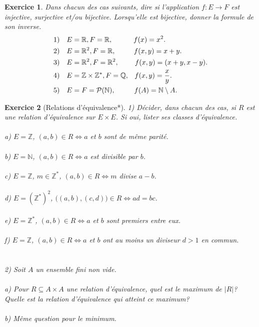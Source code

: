 \documentclass[11pt,french,table]{article}
\theoremstyle{exercice}
\newtheorem{exercice}{Exercice}
\newcommand{\R}{\mathbb{R}}
\newcommand{\Q}{\mathbb{Q}}
\newcommand{\Z}{\mathbb{Z}}
\newcommand{\N}{\mathbb{N}}
\begin{document}
\vspace{2em}
\begin{exercice}
Dans chacun des cas suivants, dire si l'application $f : E \longrightarrow F$ est injective, surjective et/ou bijective. Lorsqu'elle est bijective, donner la formule de son inverse. 
\begin{align*}
\textnormal{1)}& \quad E = \R, F=\R, \hspace{3em} f(x) = x^2. \\
\textnormal{2)}& \quad E = \R^2, F= \R, \hspace{2.6em} f(x,y) = x + y. \\
\textnormal{3)}& \quad E = \R^2, F= \R^2, \hspace{2.3em} f(x,y) = (x + y,x-y). \\
\textnormal{4)}& \quad E = \Z \times \Z^*,F= \Q, \hspace{0.8em} f(x,y) =  \dfrac{x}{y}. \\
\textnormal{5)}& \quad E = F= \mathcal{P}(\N), \hspace{2.7em} f(A) = \N \setminus A.
\end{align*}
\end{exercice}
\vspace{2em}
\begin{exercice}[Relations d'équivalence*]
1) Décider, dans chacun des cas, si $R$ est une relation d'équivalence sur $E \times E$. Si oui, lister ses classes d'équivalence. \\ \\
\indent a) $E = \Z$, $(a,b) \in R \iff a$ et $b$ sont de même parité. \\
\\
\indent b) $E = \N$, $(a,b) \in R \iff a$ est divisible par $b$. \\ \\
\indent c) $E = \Z$, $m \in \Z^*$, $(a,b) \in R \iff m$ divise $a-b$. \\ \\
\indent d) $E = (\Z^*)^2$, $\big( (a,b),(c,d) \big) \in R \iff ad = bc$. \\ \\
\indent e) $E = \Z^*$, $(a,b) \in R \iff a$ et $b$ sont premiers entre eux. \\ \\
\indent f) $E = \Z$, $(a,b) \in R \iff a$ et $b$ ont au moins un diviseur $d > 1$ en commun. \\ \\ \\
2) Soit $A$ un ensemble fini non vide. \\ \\
\indent a) Pour $R \subseteq A \times A$ une relation d'équivalence, quel est le maximum de $\vert R \vert$? Quelle \indent est la relation d'équivalence qui atteint ce maximum? \\ \\
\indent b) Même question pour le minimum.
\end{exercice}
\end{document}
